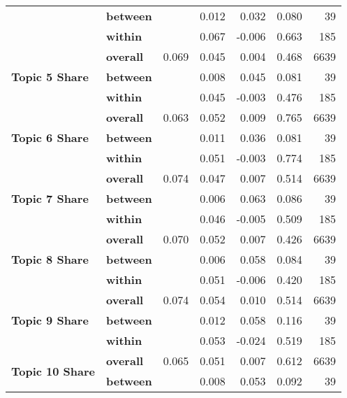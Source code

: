 \begin{longtable}{lllrrrr}
               & \textbf{between} &       &      0.012 &  0.032 & 0.080 &            39 \\
               & \textbf{within} &       &      0.067 & -0.006 & 0.663 &           185 \\
\cline{1-7}
\multirow{3}{*}{\textbf{Topic 5 Share}} & \textbf{overall} & 0.069 &      0.045 &  0.004 & 0.468 &          6639 \\
               & \textbf{between} &       &      0.008 &  0.045 & 0.081 &            39 \\
               & \textbf{within} &       &      0.045 & -0.003 & 0.476 &           185 \\
\cline{1-7}
\multirow{3}{*}{\textbf{Topic 6 Share}} & \textbf{overall} & 0.063 &      0.052 &  0.009 & 0.765 &          6639 \\
               & \textbf{between} &       &      0.011 &  0.036 & 0.081 &            39 \\
               & \textbf{within} &       &      0.051 & -0.003 & 0.774 &           185 \\
\cline{1-7}
\multirow{3}{*}{\textbf{Topic 7 Share}} & \textbf{overall} & 0.074 &      0.047 &  0.007 & 0.514 &          6639 \\
               & \textbf{between} &       &      0.006 &  0.063 & 0.086 &            39 \\
               & \textbf{within} &       &      0.046 & -0.005 & 0.509 &           185 \\
\cline{1-7}
\multirow{3}{*}{\textbf{Topic 8 Share}} & \textbf{overall} & 0.070 &      0.052 &  0.007 & 0.426 &          6639 \\
               & \textbf{between} &       &      0.006 &  0.058 & 0.084 &            39 \\
               & \textbf{within} &       &      0.051 & -0.006 & 0.420 &           185 \\
\cline{1-7}
\multirow{3}{*}{\textbf{Topic 9 Share}} & \textbf{overall} & 0.074 &      0.054 &  0.010 & 0.514 &          6639 \\
               & \textbf{between} &       &      0.012 &  0.058 & 0.116 &            39 \\
               & \textbf{within} &       &      0.053 & -0.024 & 0.519 &           185 \\
\cline{1-7}
\multirow{3}{*}{\textbf{Topic 10 Share}} & \textbf{overall} & 0.065 &      0.051 &  0.007 & 0.612 &          6639 \\
               & \textbf{between} &       &      0.008 &  0.053 & 0.092 &            39 \\

\end{longtable}
